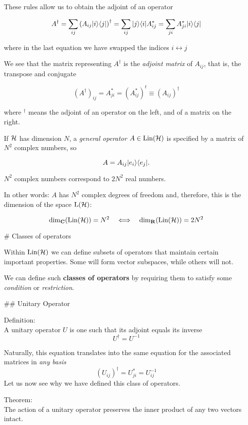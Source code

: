\documentclass[11pt]{article}
\begin{document}
These rules allow us to obtain the adjoint of an operator

\[
A^\dagger = \sum_{ij} \left( A_{ij} | i\rangle \langle j| \right)^\dagger = \sum_{ij} | j\rangle \langle i| A_{ij}^* = \sum_{ji} A_{ji}^* | i\rangle \langle j|
\]

where in the last equation we have swapped the indices
\(i \leftrightarrow j\)

    We see that the matrix representing \(A^\dagger\) is the \emph{adjoint
matrix} of \(A_{ij}\), that is, the transpose and conjugate

\[
(A^\dagger)_{ij} = A^*_{ji} = (A^*_{ij})^t \equiv (A_{ij})^\dagger
\]

where \(^\dagger\) means the adjoint of an operator on the left, and of
a matrix on the right.

    If \({\cal H}\) has dimension \(N\), a \emph{general operator}
\(A \in \hbox{Lin}({\cal H})\) is specified by a matrix of \(N^2\) complex
numbers, so

\[
A = A_{ij} |e_i\rangle \langle e_j|.
\]

\(N^2\) complex numbers correspond to \(2N^2\) real numbers.

    In other words: \(A\) has \(N^2\) complex degrees of freedom and,
therefore, this is the dimension of the space \({\rm L}({\cal H})\):

\[
{\rm dim}_{\mathbf{C}}(\hbox{Lin}({\cal H})) = N^2 ~~~ \Longleftrightarrow ~~~ {\rm dim}_{\mathbf{R}}(\hbox{Lin}({\cal H})) = 2 N^2
\]

    \# Classes of operators

    Within \(\hbox{Lin}({\cal H})\) we can define subsets of operators that maintain
certain important properties. Some will form vector subspaces, while
others will not.

We can define such \textbf{classes of operators} by requiring them to
satisfy some \emph{condition} or \emph{restriction}.

    \#\# Unitary Operator

Definition:\\
A unitary operator \(U\) is one such that its adjoint equals its inverse
\\
\[
U^\dagger = U^{-1}
\]

    Naturally, this equation translates into the same equation for the
associated matrices in \emph{any basis} \[
(U_{ij})^\dagger = U_{ji}^* = U^{-1}_{ij}
\] Let us now see why we have defined this class of operators.

    Theorem: \\
The action of a unitary operator preserves the inner product of any two
vectors intact.
\end{document}
